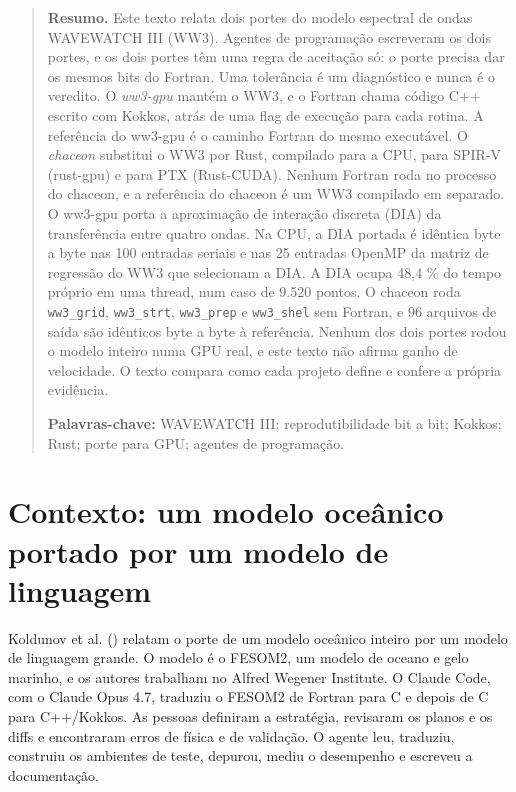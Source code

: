 \documentclass[10pt,a4paper,]{article}
\begin{document}
\begin{quote}
\small\textbf{Resumo.} Este texto relata dois portes do modelo espectral
de ondas WAVEWATCH III (WW3). Agentes de programação escreveram os dois
portes, e os dois portes têm uma regra de aceitação só: o porte precisa
dar os mesmos bits do Fortran. Uma tolerância é um diagnóstico e nunca é
o veredito. O \emph{ww3-gpu} mantém o WW3, e o Fortran chama código C++
escrito com Kokkos, atrás de uma flag de execução para cada rotina. A
referência do ww3-gpu é o caminho Fortran do mesmo executável. O
\emph{chaceon} substitui o WW3 por Rust, compilado para a CPU, para
SPIR-V (rust-gpu) e para PTX (Rust-CUDA). Nenhum Fortran roda no
processo do chaceon, e a referência do chaceon é um WW3 compilado em
separado. O ww3-gpu porta a aproximação de interação discreta (DIA) da
transferência entre quatro ondas. Na CPU, a DIA portada é idêntica byte
a byte nas 100 entradas seriais e nas 25 entradas OpenMP da matriz de
regressão do WW3 que selecionam a DIA. A DIA ocupa 48,4 \% do tempo
próprio em uma thread, num caso de 9.520 pontos. O chaceon roda
\texttt{ww3\_grid}, \texttt{ww3\_strt}, \texttt{ww3\_prep} e
\texttt{ww3\_shel} sem Fortran, e 96 arquivos de saída são idênticos
byte a byte à referência. Nenhum dos dois portes rodou o modelo inteiro
numa GPU real, e este texto não afirma ganho de velocidade. O texto
compara como cada projeto define e confere a própria evidência.

\textbf{Palavras-chave:} WAVEWATCH III; reprodutibilidade bit a
bit; Kokkos; Rust; porte para GPU; agentes de programação.
\end{quote}

\setcounter{section}{-1}

\section{Contexto: um modelo oceânico portado por um modelo de
linguagem}\label{sec:context}

Koldunov et al. ()
relatam o porte de um modelo oceânico inteiro por um modelo de linguagem
grande. O modelo é o FESOM2, um modelo de oceano e gelo marinho, e os
autores trabalham no Alfred Wegener Institute. O Claude Code, com o
Claude Opus 4.7, traduziu o FESOM2 de Fortran para C e depois de C para
C++/Kokkos. As pessoas definiram a estratégia, revisaram os planos e os
diffs e encontraram erros de física e de validação. O agente leu,
traduziu, construiu os ambientes de teste, depurou, mediu o desempenho e
escreveu a documentação.
\end{document}

